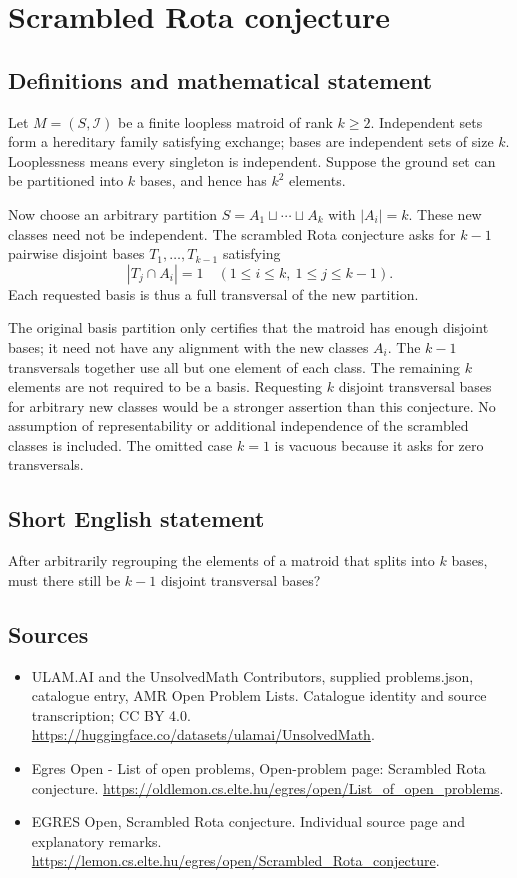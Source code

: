 \documentclass[11pt,a4paper]{article}
\begin{document}
\section*{Scrambled Rota conjecture}\label{statement}

\subsection{Definitions and mathematical statement}
Let $M=(S,\mathcal I)$ be a finite loopless matroid of rank $k\ge2$.
Independent sets form a hereditary family satisfying exchange;
bases are independent sets of size $k$. Looplessness means every
singleton is independent. Suppose the ground set can be partitioned
into $k$ bases, and hence has $k^2$ elements.

Now choose an arbitrary partition $S=A_1\sqcup\cdots\sqcup A_k$
with $|A_i|=k$. These new classes need not be independent.
The scrambled Rota conjecture asks for $k-1$ pairwise disjoint
bases $T_1,\ldots,T_{k-1}$ satisfying
\[
                              |T_j\cap A_i|=1
                                \quad(1\le i\le k,\ 1\le j\le k-1).
\]
Each requested basis is thus a full transversal of the new partition.

The original basis partition only certifies that the matroid has
enough disjoint bases; it need not have any alignment with the
new classes $A_i$. The $k-1$ transversals together use all but one
element of each class. The remaining $k$ elements are not required
to be a basis. Requesting $k$ disjoint transversal bases for arbitrary
new classes would be a stronger assertion than this conjecture.
No assumption of representability or additional independence of
the scrambled classes is included. The omitted case $k=1$ is
vacuous because it asks for zero transversals.
\subsection{Short English statement}
After arbitrarily regrouping the elements of a matroid that
splits into $k$ bases, must there still be $k-1$ disjoint transversal bases?
\subsection{Sources}
\begin{itemize}
\item[S1] ULAM.AI and the UnsolvedMath Contributors, supplied problems.json, catalogue entry, AMR Open Problem Lists. Catalogue identity and source transcription; CC BY 4.0.
\url{https://huggingface.co/datasets/ulamai/UnsolvedMath}.
\item[S2] Egres Open - List of open problems, Open-problem page: Scrambled Rota conjecture. 
\url{https://oldlemon.cs.elte.hu/egres/open/List_of_open_problems}.
\item[S3] EGRES Open, Scrambled Rota conjecture. Individual source page and explanatory remarks.
\url{https://lemon.cs.elte.hu/egres/open/Scrambled_Rota_conjecture}.
\end{itemize}
\end{document}
